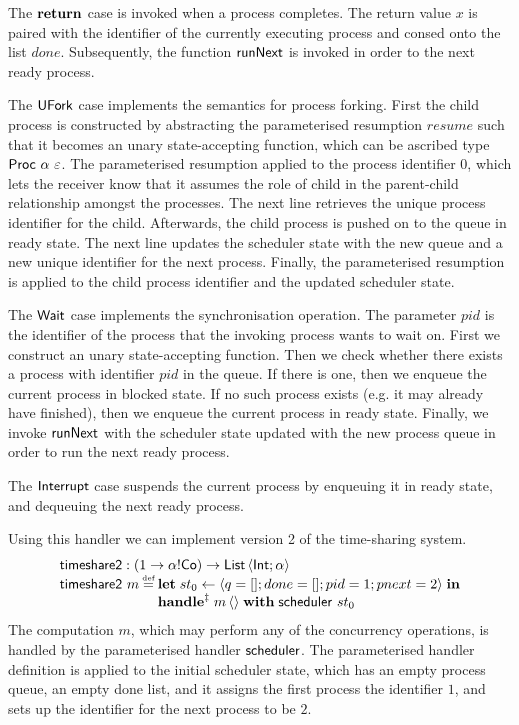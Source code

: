 \documentclass[12pt,phd,lfcs,twoside,openright,logo,leftchapter,normalheadings]{infthesis}
\theoremstyle{plain}
\theoremstyle{definition}
\begin{document}
The $\mathbf{return}$ case is invoked when a process completes. The return
value $x$ is paired with the identifier of the currently executing
process and consed onto the list $done$. Subsequently, the function
$\mathsf{runNext}$ is invoked in order to the next ready process.

The $\mathsf{UFork}$ case implements the semantics for process forking. First
the child process is constructed by abstracting the parameterised
resumption $resume$ such that it becomes an unary state-accepting
function, which can be ascribed type $\mathsf{Proc}~\alpha~\varepsilon$. The
parameterised resumption applied to the process identifier $0$, which
lets the receiver know that it assumes the role of child in the
parent-child relationship amongst the processes. The next line
retrieves the unique process identifier for the child. Afterwards, the
child process is pushed on to the queue in ready state. The next line
updates the scheduler state with the new queue and a new unique
identifier for the next process. Finally, the parameterised resumption
is applied to the child process identifier and the updated scheduler
state.

The $\mathsf{Wait}$ case implements the synchronisation operation. The
parameter $pid$ is the identifier of the process that the invoking
process wants to wait on. First we construct an unary state-accepting
function. Then we check whether there exists a process with identifier
$pid$ in the queue. If there is one, then we enqueue the current
process in blocked state. If no such process exists (e.g. it may
already have finished), then we enqueue the current process in ready
state. Finally, we invoke $\mathsf{runNext}$ with the scheduler state updated
with the new process queue in order to run the next ready process.

The $\mathsf{Interrupt}$ case suspends the current process by enqueuing it in
ready state, and dequeuing the next ready process.

Using this handler we can implement version 2 of the time-sharing
system.
%
\[
  \bl
    \timesharee : (\UnitType \to \alpha \eff \Co) \to \List\,\Record{\Int;\alpha}\\
    \timesharee~m \defas
      \bl
        \Let\;st_0 \revto \Record{q=\nil;done=\nil;pid=1;pnext=2}\;\In\\
        \ParamHandle\;m\,\Unit\;\With\; \scheduler~st_0
      \el
  \el
\]
%
The computation $m$, which may perform any of the concurrency
operations, is handled by the parameterised handler $\mathsf{scheduler}$. The
parameterised handler definition is applied to the initial scheduler
state, which has an empty process queue, an empty done list, and it
assigns the first process the identifier $1$, and sets up the
identifier for the next process to be $2$.
\end{document}
